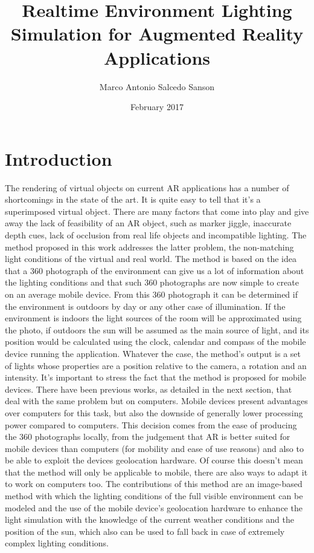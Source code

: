 \documentclass{article}
\title{Realtime Environment Lighting Simulation for Augmented Reality  Applications}
\author{Marco Antonio Salcedo Sanson }
\date{February 2017}
\begin{document}
\maketitle

\section{Introduction}
The rendering of virtual objects on current AR applications has a number of shortcomings in the state of the art. It is quite easy to tell that it’s a superimposed virtual object. There are many factors that come into play and give away the lack of feasibility of an AR object, such as marker jiggle, inaccurate depth cues, lack of occlusion from real life objects and incompatible lighting.
The method proposed in this work addresses the latter problem, the non-matching light conditions of the virtual and real world. The method is based on the idea that a 360 photograph of the environment can give us a lot of information about the lighting conditions and that such 360 photographs are now simple to create on an average mobile device. From this 360 photograph it can be determined if the environment is outdoors by day or any other case of illumination. If the environment is indoors the light sources of the room will be approximated using the photo, if outdoors the sun will be assumed as the main source of light, and its position would be calculated using the clock, calendar and compass of the mobile device running the application. 
Whatever the case, the method's output is a set of lights whose properties are a position relative to the camera, a rotation and an intensity.
It's important to stress the fact that the method is proposed for mobile devices. There have been previous works, as detailed in the next section, that deal with the same problem but on computers. Mobile devices present advantages over computers for this task, but also the downside of generally lower processing power compared to computers. This decision comes from the ease of producing the 360 photographs locally, from the judgement that AR is better suited for mobile devices than computers (for mobility and ease of use reasons) and also to be able to exploit the devices geolocation hardware. Of course this doesn't mean that the method will only be applicable to mobile, there are also ways to adapt it to work on computers too.
The contributions of this method are an image-based method with which the lighting conditions of the full visible environment can be modeled and the use of the mobile device's geolocation hardware to enhance the light simulation with the knowledge of the current weather conditions and the position of the sun, which also can be used to fall back in case of extremely complex lighting conditions.
\end{document}
